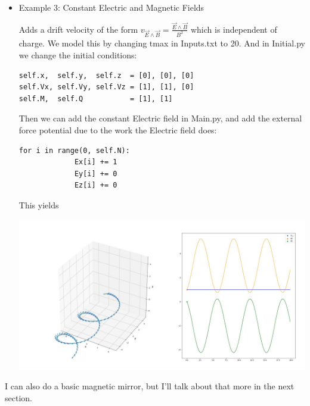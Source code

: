 \documentclass[12pt]{article}
\begin{document}
\begin{itemize}
\item Example 3: Constant Electric and Magnetic Fields

Adds a drift velocity of the form $v_{\vec{E}\wedge\vec{B}}=\frac{\vec{E}\wedge\vec{B}}{B^2}$ which is independent of charge. We model this by changing tmax in Inputs.txt to 20. And in Initial.py we change the initial conditions:
\begin{verbatim}
self.x,  self.y,  self.z  = [0], [0], [0]
self.Vx, self.Vy, self.Vz = [1], [1], [0]
self.M,  self.Q           = [1], [1]
\end{verbatim}
Then we can add the constant Electric field in Main.py, and add the external force potential due to the work the Electric field does:
\begin{verbatim}
for i in range(0, self.N):
             Ex[i] += 1
             Ey[i] += 0
             Ez[i] += 0
\end{verbatim}
This yields

\hspace{-1cm}\includegraphics[scale=0.35]{example3}
\end{itemize}
I can also do a basic magnetic mirror, but I'll talk about that more in the next section.
\end{document}
